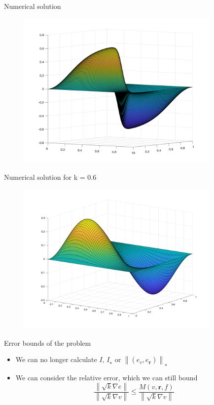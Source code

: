 \documentclass{beamer}
\newcommand{\norm}[1]{\left\lVert#1\right\rVert}
\begin{document}
    \begin{frame}{Numerical solution}
        \begin{figure}
            \includegraphics[width=10cm]{solution.png}
        \end{figure}
    \end{frame}

    \begin{frame}{Numerical solution for k = 0.6}
        \begin{figure}
            \includegraphics[width=10cm]{solution_constant_k.png}
        \end{figure}
    \end{frame}

    \begin{frame}{Error bounds of the problem}
        \begin{itemize}
            \item We can no longer calculate $I$, $I_\star$ or $\norm{(e_v, e_{\bm{r}})}_\star$
            \item We can consider the relative error, which we can still bound
            \begin{equation*}
                \frac{\norm{\sqrt{k}\nabla e}}{\norm{\sqrt{k}\nabla v}} \leq \frac{M(v, \bm{r}, f)}{\norm{\sqrt{k}\nabla v}}
            \end{equation*}
        \end{itemize}
    \end{frame}
\end{document}
